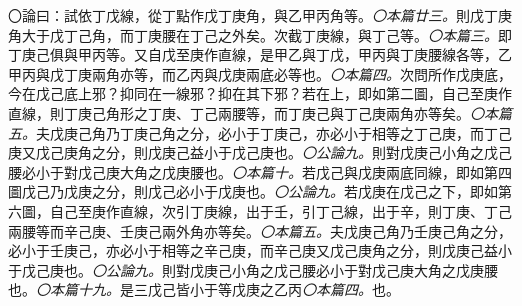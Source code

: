 \documentclass[12pt,b5paper,landscape]{article}
\newcommand{\ccom}[1]{{\footnotesize \emph{〇#1}}}
\newcommand{\bcom}[1]{〇#1}
\begin{document}
\begin{multicols}{2}
\bcom{論曰：試依丁戊線，從丁點作戊丁庚角，與乙甲丙角等。\ccom{本篇廿三。}則戊丁庚角大于戊丁己角，而丁庚腰在丁己之外矣。次截丁庚線，與丁己等。\ccom{本篇三。}即丁庚己俱與甲丙等。又自戊至庚作直線，是甲乙與丁戊，甲丙與丁庚腰線各等，乙甲丙與戊丁庚兩角亦等，而乙丙與戊庚兩底必等也。\ccom{本篇四。}次問所作戊庚底，今在戊己底上邪？抑同在一線邪？抑在其下邪？若在上，即如第二圖，自己至庚作直線，則丁庚己角形之丁庚、丁己兩腰等，而丁庚己與丁己庚兩角亦等矣。\ccom{本篇五。}夫戊庚己角乃丁庚己角之分，必小于丁庚己，亦必小于相等之丁己庚，而丁己庚又戊己庚角之分，則戊庚己益小于戊己庚也。\ccom{公論九。}則對戊庚己小角之戊己腰必小于對戊己庚大角之戊庚腰也。\ccom{本篇十。}若戊己與戊庚兩底同線，即如第四圖戊己乃戊庚之分，則戊己必小于戊庚也。\ccom{公論九。}若戊庚在戊己之下，即如第六圖，自己至庚作直線，次引丁庚線，出于壬，引丁己線，出于辛，則丁庚、丁己兩腰等而辛己庚、壬庚己兩外角亦等矣。\ccom{本篇五。}夫戊庚己角乃壬庚己角之分，必小于壬庚己，亦必小于相等之辛己庚，而辛己庚又戊己庚角之分，則戊庚己益小于戊己庚也。\ccom{公論九。}則對戊庚己小角之戊己腰必小于對戊己庚大角之戊庚腰也。\ccom{本篇十九。}是三戊己皆小于等戊庚之乙丙\ccom{本篇四。}也。}


\end{multicols}
\end{document}
